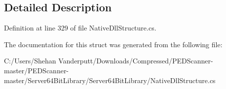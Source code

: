 \subsection{Detailed Description}


Definition at line 329 of file Native\+Dll\+Structure.\+cs.



The documentation for this struct was generated from the following file\+:\begin{DoxyCompactItemize}
\item 
C\+:/\+Users/\+Shehan Vanderputt/\+Downloads/\+Compressed/\+P\+E\+D\+Scanner-\/master/\+P\+E\+D\+Scanner-\/master/\+Server64\+Bit\+Library/\+Server64\+Bit\+Library/Native\+Dll\+Structure.\+cs\end{DoxyCompactItemize}
